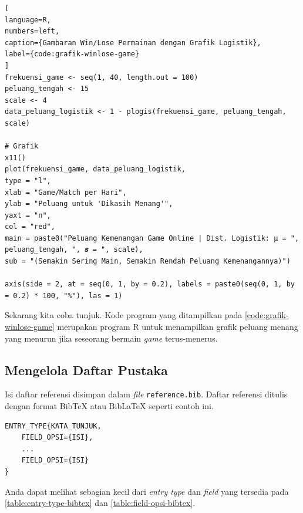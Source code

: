 \begin{enumerate}[]
\begin{lstlisting}[
language=R, 
numbers=left,
caption={Gambaran Win/Lose Permainan dengan Grafik Logistik},
label={code:grafik-winlose-game}
]
frekuensi_game <- seq(1, 40, length.out = 100)
peluang_tengah <- 15
scale <- 4
data_peluang_logistik <- 1 - plogis(frekuensi_game, peluang_tengah, scale)

# Grafik
x11()
plot(frekuensi_game, data_peluang_logistik,
type = "l",
xlab = "Game/Match per Hari",
ylab = "Peluang untuk 'Dikasih Menang'",
yaxt = "n",
col = "red",
main = paste0("Peluang Kemenangan Game Online | Dist. Logistik: μ = ", peluang_tengah, ", 𝒔 = ", scale),
sub = "(Semakin Sering Main, Semakin Rendah Peluang Kemenangannya)")

axis(side = 2, at = seq(0, 1, by = 0.2), labels = paste0(seq(0, 1, by = 0.2) * 100, "%"), las = 1)
    \end{lstlisting}
    
    Sekarang kita coba tunjuk. Kode program yang ditampilkan pada \autoref{code:grafik-winlose-game} merupakan program R untuk menampilkan grafik peluang menang yang menurun jika seseorang bermain \textit{game} terus-menerus.
\end{enumerate}

\subsection{Mengelola Daftar Pustaka}\label{subsec:mengelola-dapus}

Isi daftar referensi disimpan dalam \textit{file} \texttt{reference.bib}. Daftar referensi ditulis dengan format BibTeX atau BibLaTeX seperti contoh ini.

\begin{lstlisting}
ENTRY_TYPE{KATA_TUNJUK,
    FIELD_OPSI={ISI},
    ...
    FIELD_OPSI={ISI}
}
\end{lstlisting}

Anda dapat melihat sebagian kecil dari \textit{entry type} dan \textit{field} yang tersedia pada \autoref{table:entry-type-bibtex} dan \autoref{table:field-opsi-bibtex}.

